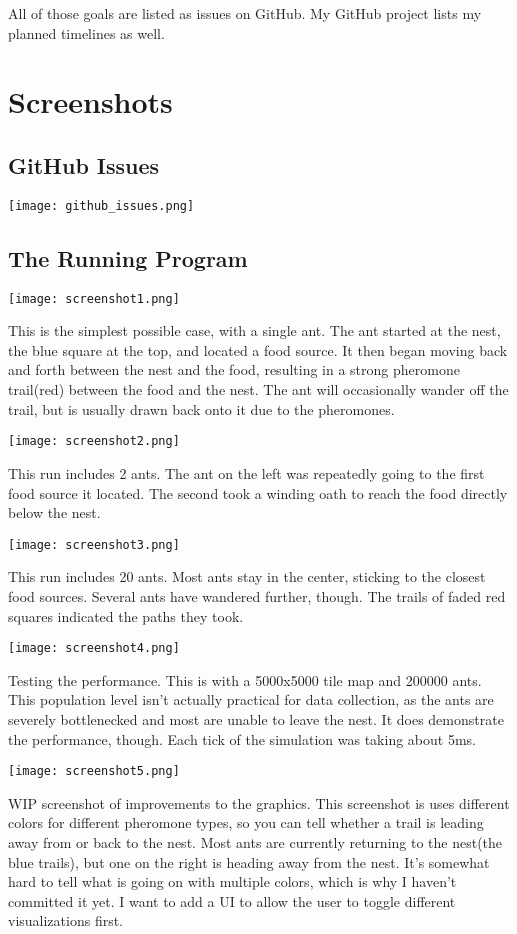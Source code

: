 \documentclass{article}
\begin{document}
All of those goals are listed as issues on GitHub.  My GitHub project lists my planned timelines as well.


\section{Screenshots}

\subsection{GitHub Issues}

\texttt{[image: github\_issues.png]}

\subsection{The Running Program}

\texttt{[image: screenshot1.png]}

This is the simplest possible case, with a single ant.  The ant started at the nest, the blue square at the top, and located a food source.  It then began moving back and forth between the nest and the food, resulting in a strong pheromone trail(red) between the food and the nest.  The ant will occasionally wander off the trail, but is usually drawn back onto it due to the pheromones.


\texttt{[image: screenshot2.png]}

This run includes 2 ants.  The ant on the left was repeatedly going to the first food source it located.  The second took a winding oath to reach the food directly below the nest.

\texttt{[image: screenshot3.png]}

This run includes 20 ants.  Most ants stay in the center, sticking to the closest food sources.  Several ants have wandered further, though.  The trails of faded red squares indicated the paths they took.


\texttt{[image: screenshot4.png]}

Testing the performance.  This is with a 5000x5000 tile map and 200000 ants.  This population level isn't actually practical for data collection, as the ants are severely bottlenecked and most are unable to leave the nest.  It does demonstrate the performance, though.  Each tick of the simulation was taking about 5ms.


\texttt{[image: screenshot5.png]}

WIP screenshot of improvements to the graphics.  This screenshot is uses different colors for different pheromone types, so you can tell whether a trail is leading away from or back to the nest.  Most ants are currently returning to the nest(the blue trails), but one on the right is heading away from the nest.  It's somewhat hard to tell what is going on with multiple colors, which is why I haven't committed it yet.  I want to add a UI to allow the user to toggle different visualizations first.
\end{document}
